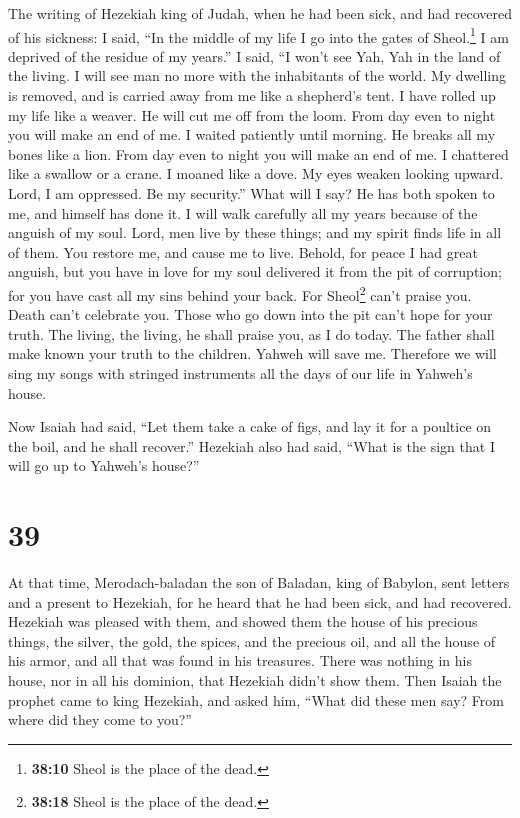  The writing of Hezekiah king of Judah, when he had been
sick, and had recovered of his sickness:  I said, ``In
the middle of my life I go into the gates of Sheol.\footnote{\textbf{38:10}
  Sheol is the place of the dead.} I am deprived of the residue of my
years.''  I said, ``I won't see Yah, Yah in the land of
the living. I will see man no more with the inhabitants of the world.
 My dwelling is removed, and is carried away from me like
a shepherd's tent. I have rolled up my life like a weaver. He will cut
me off from the loom. From day even to night you will make an end of me.
 I waited patiently until morning. He breaks all my bones
like a lion. From day even to night you will make an end of me.
 I chattered like a swallow or a crane. I moaned like a
dove. My eyes weaken looking upward. Lord, I am oppressed. Be my
security.''  What will I say? He has both spoken to me,
and himself has done it. I will walk carefully all my years because of
the anguish of my soul.  Lord, men live by these things;
and my spirit finds life in all of them. You restore me, and cause me to
live.  Behold, for peace I had great anguish, but you
have in love for my soul delivered it from the pit of corruption; for
you have cast all my sins behind your back.  For
Sheol\footnote{\textbf{38:18} Sheol is the place of the dead.} can't
praise you. Death can't celebrate you. Those who go down into the pit
can't hope for your truth.  The living, the living, he
shall praise you, as I do today. The father shall make known your truth
to the children.  Yahweh will save me. Therefore we will
sing my songs with stringed instruments all the days of our life in
Yahweh's house.

 Now Isaiah had said, ``Let them take a cake of figs, and
lay it for a poultice on the boil, and he shall recover.''
 Hezekiah also had said, ``What is the sign that I will
go up to Yahweh's house?''

\hypertarget{section-38}{%
\section{39}\label{section-38}}

 At that time, Merodach-baladan the son of Baladan, king
of Babylon, sent letters and a present to Hezekiah, for he heard that he
had been sick, and had recovered.  Hezekiah was pleased
with them, and showed them the house of his precious things, the silver,
the gold, the spices, and the precious oil, and all the house of his
armor, and all that was found in his treasures. There was nothing in his
house, nor in all his dominion, that Hezekiah didn't show them.
 Then Isaiah the prophet came to king Hezekiah, and asked
him, ``What did these men say? From where did they come to you?''

